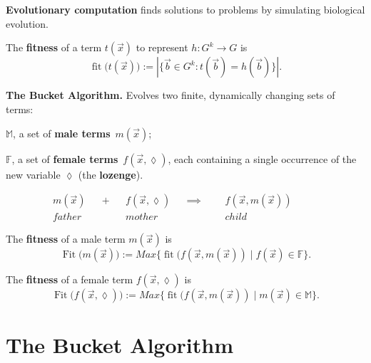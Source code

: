\documentclass{beamer}
\newcommand{\lz}{{\lozenge}}
\newcommand{\vb}{\vec b}
\newcommand{\vx}{\vec x}
\newcommand{\fit}[1]{\operatorname{fit}{#1}}
\newcommand{\Fit}[1]{\operatorname{Fit}{#1}}
\begin{document}
\section[Evolutionary Computation]{}

\begin{frame}
\textbf{Evolutionary computation} finds solutions to problems by simulating biological evolution. 
\medskip
\pause 

The \textbf{fitness} of a term $t(\vx)$ to represent $h:G^k \to G$ is 
\[
\fit(t(\vx)) := |\{\vb \in G^k :  t(\vb) = h(\vb)\}|.
\]
\pause
\vspace{-3mm}

\textbf{The Bucket Algorithm. }  Evolves two finite, dynamically changing sets of terms:
\pause
\medskip

$\mathbb M$, a set of \textbf{male terms}~$m(\vx)$;
\medskip
\pause

$\mathbb F$, a set of \textbf{female terms}~$f(\vx,\lz)$, each containing a single occurrence of the new variable $\lz$ (the \textbf{lozenge}).
\end{frame}






\begin{frame}
\begin{align*}
 &&&&  m(\vx)  && + && f(\vx,\lz)&& \implies &&& f(\vx,m(\vx))&&\ &&\\ 
 &&&& father    &&&&     mother &&                &&&  child &&  && &&
&
\end{align*}
\pause

The \textbf{fitness} of a male term $m(\vx)$ is 
\[
\Fit(m(\vx)) := Max\{\fit(f(\vx,m(\vx)) \mid f(\vx) \in \mathbb F\}.
\]
\pause

The \textbf{fitness} of a female term $f(\vx, \lz)$ is 
\[
\Fit(f(\vx,\lz)) := Max\{\fit(f(\vx,m(\vx)) \mid m(\vx) \in \mathbb M\}. 
\]

\end{frame}




\section{The Bucket Algorithm}
\end{document}
